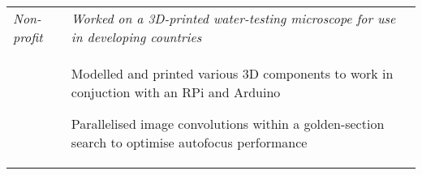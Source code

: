 \documentclass[letterpaper, 10pt]{article}
\begin{document}
\begin{tabularx}{\linewidth}{>{\raggedleft}p{2.2cm}|X}
\textit{Non-profit}	& \textit{Worked on a 3D-printed water-testing microscope for use in developing countries}\\
					& \vspace{-.5\baselineskip}\begin{compact}
						\item Modelled and printed various 3D components to work in conjuction with an RPi and Arduino
						\item Parallelised image convolutions within a golden-section search to optimise autofocus performance
						\vspace{-2\baselineskip}
					\end{compact}
\end{tabularx}


\end{document}
